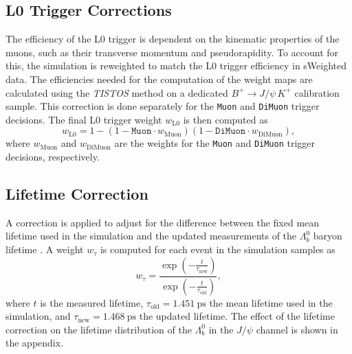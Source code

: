 \subsection{L0 Trigger Corrections}
\label{sec:run2_trigger_corrections}
The efficiency of the L0 trigger is dependent on the kinematic properties of the muons, such as their transverse momentum and pseudorapidity. To account for this, the simulation is reweighted to match the L0 trigger efficiency in sWeighted data. The efficiencies needed for the computation of the weight maps are calculated using the \textit{TISTOS} method \cite{TISTOS} on a dedicated $B^+ \to J/\psi \,K^+$ calibration sample. This correction is done separately for the \texttt{Muon} and \texttt{DiMuon} trigger decisions. The final L0 trigger weight $w_\text{L0}$ is then computed as
\begin{equation*}
    w_{\text{L0}} = 1 - (1- \texttt{Muon} \cdot w_{\text{Muon}})(1- \texttt{DiMuon} \cdot w_{\text{DiMuon}}),
\end{equation*}
where $w_{\text{Muon}}$ and $w_{\text{DiMuon}}$ are the weights for the \texttt{Muon} and \texttt{DiMuon} trigger decisions, respectively.

\subsection{Lifetime Correction}
\label{sec:run2_lifetime_correction}
 A correction is applied to adjust for the difference between the fixed mean lifetime used in the simulation and the updated measurements of the $\Lambda_b^0$ baryon lifetime \cite{pdg2024}. A weight $w_{\tau}$ is computed for each event in the simulation samples as
\begin{equation*}
    w_{\tau} = \frac{\exp \left(-\frac{t}{\tau_{\text{new}}}\right)}{\exp \left(-\frac{t}{\tau_{\text{old}}}\right)},
\end{equation*}
where $t$ is the measured lifetime, $\tau_{\text{old}} = \qty{1.451}{\pico\second}$ the mean lifetime used in the simulation, and $\tau_{\text{new}} = \qty{1.468}{\pico\second}$ \cite{pdg2024} the updated lifetime. The effect of the lifetime correction on the lifetime distribution of the $\Lambda_b^0$ in the $J/\psi$ channel is shown in the appendix.

